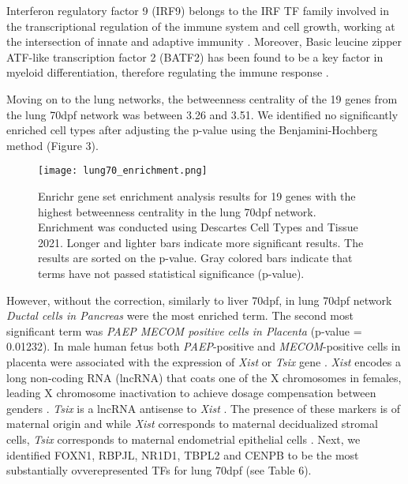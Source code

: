\documentclass[
	a4paper, %
	10pt, %
	unnumberedsections, %
	twoside, %
]{LTJournalArticle}
\begin{document}
\noindent Interferon regulatory factor 9 (IRF9) belongs to the IRF TF family involved in the 
transcriptional regulation of the immune system and cell growth, working
at the intersection of innate and adaptive immunity \autocite{paul2018a}.
Moreover, Basic leucine zipper ATF-like transcription factor 2 (BATF2) has been 
found to be a key factor in myeloid differentiation, therefore regulating
the immune response \autocite{le2023a}.

Moving on to the lung networks, the betweenness centrality of the 19 genes from the lung 70dpf 
network was between 3.26 and 3.51.	We identified no significantly enriched cell types after 
adjusting the p-value using the Benjamini-Hochberg method (Figure 3).
\begin{figure}[H] %
	\texttt{[image: lung70\_enrichment.png]}
	\caption{Enrichr gene set enrichment analysis results for 19 genes
	with the highest betweenness centrality in the lung 70dpf network. Enrichment 
	was conducted using Descartes Cell Types and Tissue 2021. Longer and lighter
	bars indicate more significant results. The results are sorted on
	the p-value. Gray colored bars indicate that terms have
	not passed statistical significance (p-value).}
	\label{fig:lung70enr}
\end{figure}

\noindent However, without the correction, similarly to liver 70dpf, in 
lung 70dpf network \textit{Ductal cells in Pancreas}
were the most enriched term. The second most significant term was
\textit{PAEP MECOM positive cells in Placenta} (p-value = 0.01232). 
In male human fetus both \textit{PAEP}-positive and \textit{MECOM}-positive
cells in placenta were associated with the expression of \textit{Xist} 
or \textit{Tsix} gene \autocite{cao2020a}. \textit{Xist} encodes a long non-coding RNA (lncRNA)
that coats one of the X chromosomes in females, leading X chromosome inactivation 
to achieve dosage compensation between genders \autocite{cerase2015a}. \textit{Tsix} is a lncRNA
antisense to \textit{Xist} \autocite{lee1999a}. The presence of these markers is of maternal origin and while
\textit{Xist} corresponds to maternal decidualized stromal cells,
\textit{Tsix} corresponds to maternal endometrial epithelial cells \autocite{cao2020a}.
Next, we identified FOXN1, RBPJL, NR1D1, TBPL2 and CENPB
to be the most substantially ovverepresented TFs for lung 70dpf (see Table 6). 
\end{document}
